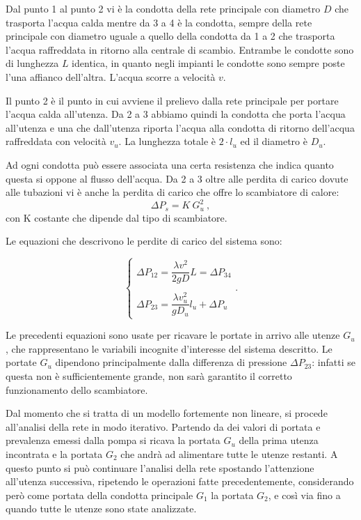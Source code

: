 \documentclass[laurea,oneside,11pt]{USiena_tesiLM3}
\begin{document}
Dal punto 1 al punto 2 vi è la condotta della rete principale con diametro $D$ che trasporta l'acqua calda mentre da 3 a 4 è la condotta, sempre della rete principale con diametro uguale a quello della condotta da 1 a 2 che trasporta l'acqua raffreddata in ritorno alla centrale di scambio. Entrambe le  condotte sono di lunghezza $L$ identica, in quanto negli impianti le condotte sono sempre poste l'una affianco dell'altra. L'acqua scorre a velocità $v$.

Il punto 2 è il punto in cui avviene il prelievo dalla rete principale per portare l'acqua calda all'utenza. Da 2 a 3 abbiamo quindi la condotta che porta l'acqua all'utenza e una che dall'utenza riporta l'acqua alla condotta di ritorno dell'acqua raffreddata con velocità $v_u$. La lunghezza totale è $2 \cdot l_u$ ed il diametro è $D_u$.

Ad ogni condotta può essere associata una certa resistenza che  indica quanto questa si oppone al flusso dell'acqua. Da 2 a 3 oltre alle perdita di carico dovute alle tubazioni vi è anche la perdita di carico che offre lo scambiatore di calore:
\begin{equation}
\Delta P_s = K \ G^2_u \ ,
\end{equation}
con K costante che dipende dal tipo di scambiatore.

Le equazioni che descrivono le perdite di carico del sistema sono:

\begin{equation}
\begin{cases}
\Delta P_{12} = \dfrac{\lambda v^2}{2 g D} L = \Delta P_{34} \\
\\
\Delta P_{23} = \dfrac{\lambda v_u^2}{ g D_u} l_u + \Delta P_u
\end{cases} .
\end{equation}

Le precedenti equazioni sono usate per ricavare le portate in arrivo alle utenze $G_u$, che rappresentano le variabili incognite d'interesse del sistema descritto. Le portate $G_u$ dipendono principalmente dalla differenza di pressione $\Delta P_{23}$: infatti se questa non è sufficientemente grande, non sarà garantito il corretto funzionamento dello scambiatore.

Dal momento che si tratta di un modello fortemente non lineare, si procede all'analisi della rete in modo iterativo. Partendo da dei valori di portata e prevalenza emessi dalla pompa si ricava la portata $G_u$ della prima utenza incontrata e la portata $G_2$ che andrà ad alimentare tutte le utenze restanti. A questo punto si può continuare l'analisi della rete spostando l'attenzione all'utenza successiva, ripetendo le operazioni fatte precedentemente, considerando però come portata della condotta principale $G_1$ la portata $G_2$, e così via fino a quando tutte le utenze sono state analizzate.
\end{document}
